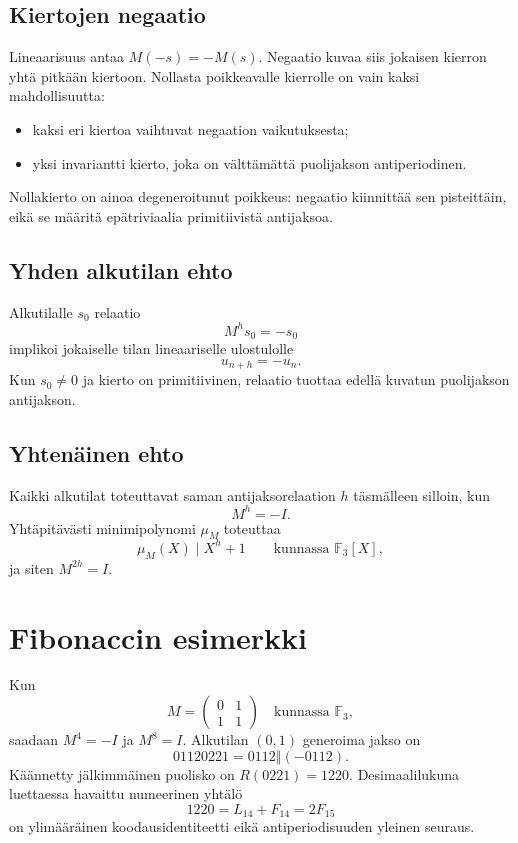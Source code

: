 \documentclass[11pt,a4paper]{article}
\newcommand{\F}{\mathbb{F}}
\newcommand{\oplusword}{\mathbin{\Vert}}
\begin{document}
\subsection{Kiertojen negaatio}
Lineaarisuus antaa $M(-s)=-M(s)$. Negaatio kuvaa siis jokaisen kierron yhtä pitkään kiertoon. Nollasta poikkeavalle kierrolle on vain kaksi mahdollisuutta:
\begin{itemize}
\item kaksi eri kiertoa vaihtuvat negaation vaikutuksesta;
\item yksi invariantti kierto, joka on välttämättä puolijakson antiperiodinen.
\end{itemize}
Nollakierto on ainoa degeneroitunut poikkeus: negaatio kiinnittää sen pisteittäin, eikä se määritä epätriviaalia primitiivistä antijaksoa.

\subsection{Yhden alkutilan ehto}
Alkutilalle $s_0$ relaatio
\[
M^hs_0=-s_0
\]
implikoi jokaiselle tilan lineaariselle ulostulolle
\[
u_{n+h}=-u_n.
\]
Kun $s_0\neq0$ ja kierto on primitiivinen, relaatio tuottaa edellä kuvatun puolijakson antijakson.

\clearpage
\subsection{Yhtenäinen ehto}
Kaikki alkutilat toteuttavat saman antijaksorelaation $h$ täsmälleen silloin, kun
\[
M^h=-I.
\]
Yhtäpitävästi minimipolynomi $\mu_M$ toteuttaa
\[
\mu_M(X)\mid X^h+1\qquad\text{kunnassa }\F_3[X],
\]
ja siten $M^{2h}=I$.

\section{Fibonaccin esimerkki}
Kun
\[
M=\begin{pmatrix}0&1\\1&1\end{pmatrix}\quad\text{kunnassa }\F_3,
\]
saadaan $M^4=-I$ ja $M^8=I$. Alkutilan $(0,1)$ generoima jakso on
\[
01120221=0112\oplusword(-0112).
\]
Käännetty jälkimmäinen puolisko on $R(0221)=1220$. Desimaalilukuna luettaessa havaittu numeerinen yhtälö
\[
1220=L_{14}+F_{14}=2F_{15}
\]
on ylimääräinen koodausidentiteetti eikä antiperiodisuuden yleinen seuraus.
\end{document}
